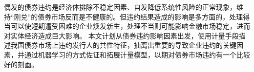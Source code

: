 \begin{cabstract}
	偶发的债券违约是经济体排除不稳定因素、自发降低系统性风险的正常现象，维持“刚兑”的债券市场反而是不健康的。但违约结果造成的影响是多方面的，处理得当可以使短期遭受困难的企业焕发新生，处理不当则可能影响金融市场稳定，进而对实体经济造成巨大影响。
	本文计划从债券违约影响因素出发，使用计量手段描述我国债券市场上违约发行人的共性特征，抽离出重要的导致企业违约的关键因素，并通过机器学习的方式佐证和拓展计量模型，以期对债券市场违约有一个比较好的刻画。
\end{cabstract}

\begin{eabstract}
\end{eabstract}

